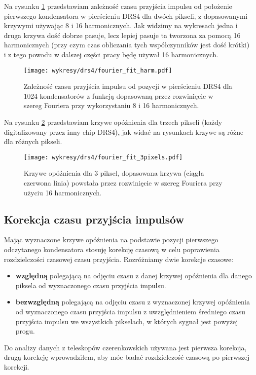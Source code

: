 \documentclass[a4paper,11pt,twoside]{article}
\begin{document}
Na rysunku \ref{fig:fourier_fit_harm} przedstawiam zależność czasu przyjścia impulsu od położenie pierwszego kondensatora w pierścieniu DRS4 dla dwóch pikseli, z dopasowanymi krzywymi używając 8 i 16 harmonicznych. Jak widzimy na wykresach jedna i druga krzywa dość dobrze pasuje, lecz lepiej pasuje ta tworzona za pomocą 16 harmonicznych (przy czym czas obliczania tych współczynników jest dość krótki) i z tego powodu w dalszej części pracy będę używał 16 harmonicznych.
\begin{figure}[H] 
\centering
\texttt{[image: wykresy/drs4/fourier\_fit\_harm.pdf]}
\caption{Zależność czasu przyjścia impulsu od pozycji w pierścieniu DRS4 dla 1024 kondensatorów z funkcją dopasowaną przez rozwinięcie w szereg Fouriera przy wykorzystaniu 8 i 16 harmonicznych.}
\label{fig:fourier_fit_harm}
\end{figure}
Na rysunku \ref{fig:fourier_fit_3} przedstawiam krzywe opóźnienia dla trzech pikseli (każdy digitalizowany przez inny chip DRS4), jak widać na rysunkach krzywe są różne dla różnych pikseli. 
\begin{figure}[H] 
\centering
\texttt{[image: wykresy/drs4/fourier\_fit\_3pixels.pdf]}
\caption{Krzywe opóźnienia dla 3 piksel, dopasowana krzywa (ciągła czerwona linia) powstała przez rozwinięcie w szereg Fouriera przy użyciu 16 harmonicznych.}
\label{fig:fourier_fit_3}
\end{figure}
\subsection{Korekcja czasu przyjścia impulsów}
Mając wyznaczone krzywe opóźnienia na podstawie pozycji pierwszego odczytanego kondensatora stosuję korekcję czasową w celu poprawienia rozdzielczości czasowej czasu przyjścia. Rozróżniamy dwie korekcje czasowe:
\begin{itemize}
\item {\bf{względną}} polegającą na odjęciu czasu z danej krzywej opóźnienia dla danego piksela od wyznaczonego czasu przyjścia impulsu.
\item {\bf{bezwzględną}} polegającą na odjęciu czasu z wyznaczonej krzywej opóźnienia od wyznaczonego czasu przyjścia impulsu z uwzględnieniem średniego czasu przyjścia impulsu we wszystkich pikselach, w których sygnał jest powyżej progu.
\end{itemize} 
Do analizy danych z teleskopów czerenkowskich używana jest pierwsza korekcja, drugą korekcję wprowadziłem, aby móc badać rozdzielczość czasową po pierwszej korekcji.
\end{document}

